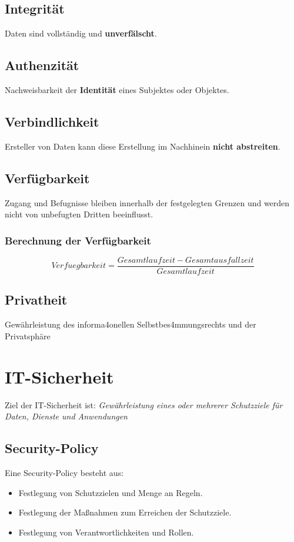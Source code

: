 \documentclass{book}
\begin{document}
\subsection{Integrität}
Daten sind vollständig und \textbf{unverfälscht}.
\subsection{Authenzität}
Nachweisbarkeit der \textbf{Identität} eines Subjektes oder Objektes.

\subsection{Verbindlichkeit}
Ersteller von Daten kann diese Erstellung im Nachhinein \textbf{nicht abstreiten}.

\subsection{Verfügbarkeit}
Zugang und Befugnisse bleiben innerhalb der festgelegten Grenzen und werden nicht von unbefugten Dritten beeinflusst.

\subsubsection{Berechnung der Verfügbarkeit}
$$Verfuegbarkeit = \frac{Gesamtlaufzeit - Gesamtausfallzeit}{Gesamtlaufzeit}$$

\subsection{Privatheit}
Gewährleistung des informa4onellen Selbstbes4mmungsrechts und der Privatsphäre

\section{IT-Sicherheit}
Ziel der IT-Sicherheit ist: \textit{Gewährleistung eines oder mehrerer Schutzziele für Daten, Dienste und
Anwendungen}

\subsection{Security-Policy}
Eine Security-Policy besteht aus:
\begin{itemize}
    \item Festlegung von Schutzzielen und Menge an Regeln.
    \item Festlegung der Maßnahmen zum Erreichen der Schutzziele.
    \item Festlegung von Verantwortlichkeiten und Rollen.
\end{itemize}
\end{document}
